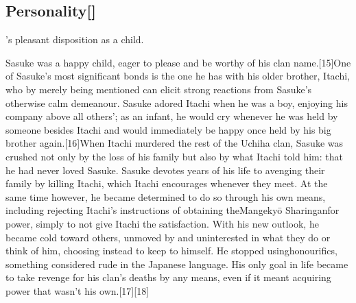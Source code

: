\documentclass[a4paper,12pt]{article}
\begin{document}
\subsection*{Personality[]}\n\nSasuke's pleasant disposition as a child.\\ \par \vspace{0.5cm}

Sasuke was a happy child, eager to please and be worthy of his clan name.[15]One of Sasuke's most significant bonds is the one he has with his older brother, Itachi, who by merely being mentioned can elicit strong reactions from Sasuke's otherwise calm demeanour. Sasuke adored Itachi when he was a boy, enjoying his company above all others'; as an infant, he would cry whenever he was held by someone besides Itachi and would immediately be happy once held by his big brother again.[16]When Itachi murdered the rest of the Uchiha clan, Sasuke was crushed not only by the loss of his family but also by what Itachi told him: that he had never loved Sasuke. Sasuke devotes years of his life to avenging their family by killing Itachi, which Itachi encourages whenever they meet. At the same time however, he became determined to do so through his own means, including rejecting Itachi's instructions of obtaining theMangekyō Sharinganfor power, simply to not give Itachi the satisfaction. With his new outlook, he became cold toward others, unmoved by and uninterested in what they do or think of him, choosing instead to keep to himself. He stopped usinghonourifics, something considered rude in the Japanese language. His only goal in life became to take revenge for his clan's deaths by any means, even if it meant acquiring power that wasn't his own.[17][18]\\ \par \vspace{0.5cm}
\end{document}
